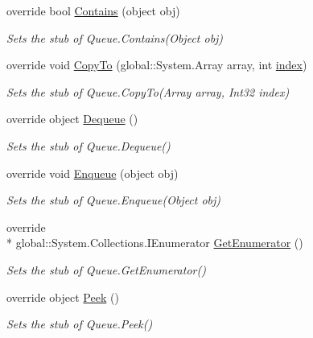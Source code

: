 \begin{DoxyCompactItemize}
override bool \hyperlink{class_system_1_1_collections_1_1_fakes_1_1_stub_queue_a34b7f14c4f70e974ad70adb52b89f5e9}{Contains} (object obj)
\begin{DoxyCompactList}\small\item\em Sets the stub of Queue.\-Contains(\-Object obj)\end{DoxyCompactList}\item 
override void \hyperlink{class_system_1_1_collections_1_1_fakes_1_1_stub_queue_a4842e890eee73f23702983e6032ebf76}{Copy\-To} (global\-::\-System.\-Array array, int \hyperlink{jquery-1_810_82-vsdoc_8js_a75bb12d1f23302a9eea93a6d89d0193e}{index})
\begin{DoxyCompactList}\small\item\em Sets the stub of Queue.\-Copy\-To(\-Array array, Int32 index)\end{DoxyCompactList}\item 
override object \hyperlink{class_system_1_1_collections_1_1_fakes_1_1_stub_queue_acdf6f858a5c63bf019eb5c4095bf4b60}{Dequeue} ()
\begin{DoxyCompactList}\small\item\em Sets the stub of Queue.\-Dequeue()\end{DoxyCompactList}\item 
override void \hyperlink{class_system_1_1_collections_1_1_fakes_1_1_stub_queue_aac028486c4671fe9c6e9916870b68637}{Enqueue} (object obj)
\begin{DoxyCompactList}\small\item\em Sets the stub of Queue.\-Enqueue(\-Object obj)\end{DoxyCompactList}\item 
override \\*
global\-::\-System.\-Collections.\-I\-Enumerator \hyperlink{class_system_1_1_collections_1_1_fakes_1_1_stub_queue_a137571fd69187053ed8b26ad9050bebc}{Get\-Enumerator} ()
\begin{DoxyCompactList}\small\item\em Sets the stub of Queue.\-Get\-Enumerator()\end{DoxyCompactList}\item 
override object \hyperlink{class_system_1_1_collections_1_1_fakes_1_1_stub_queue_a5d4c47d016f7c3ebdb9c08566fe89bb6}{Peek} ()
\begin{DoxyCompactList}\small\item\em Sets the stub of Queue.\-Peek()\end{DoxyCompactList}\item 

\end{DoxyCompactItemize}

